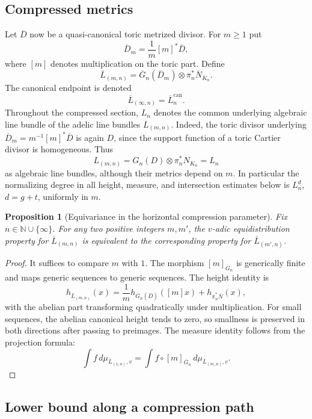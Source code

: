 \documentclass[10pt,a4paper]{amsart}
\theoremstyle{plain}
\newtheorem{proposition}[theorem]{Proposition}
\theoremstyle{plain}
\numberwithin{equation}{section}
\providecommand{\ol}{\overline}
\providecommand{\can}{\operatorname{can}}
\begin{document}
\subsection{Compressed metrics}

Let \(\ol D\) now be a quasi-canonical toric metrized divisor.  For \(m\ge 1\)
put
\[
\ol D_m=\frac{1}{m}[m]^*\ol D,
\]
where \([m]\) denotes multiplication on the toric part.  Define
\[
\ol L_{(m,n)}
=
\ol G_n(\ol D_m)\otimes\ol\pi_n^*\ol N_{K_n}.
\]
The canonical endpoint is denoted
\[
\ol L_{(\infty,n)}=\ol L_n^{\can}.
\]
Throughout the compressed section, \(L_n\) denotes the common underlying
algebraic line bundle of the adelic line bundles \(\ol L_{(m,n)}\).  Indeed,
the toric divisor underlying \(\ol D_m=m^{-1}[m]^*\ol D\) is again \(D\), since
the support function of a toric Cartier divisor is homogeneous.  Thus
\[
L_{(m,n)}
=G_n(D)\otimes\pi_n^*N_{K_n}
=L_n
\]
as algebraic line bundles, although their metrics depend on \(m\).  In
particular the normalizing degree in all height, measure, and intersection
estimates below is \(L_n^d\), \(d=g+t\), uniformly in \(m\).

\begin{proposition}[Equivariance in the horizontal compression parameter]
	\label{prop:horizontal-equivariance}
	Fix \(n\in\mathbb{N}\cup\{\infty\}\).  For any two positive integers \(m,m'\),
	the \(v\)-adic equidistribution property for \(\ol L_{(m,n)}\) is equivalent to
	the corresponding property for \(\ol L_{(m',n)}\).
\end{proposition}

\begin{proof}
	It suffices to compare \(m\) with \(1\).  The morphism
	\([m]_{\ol G_n}\) is generically finite and maps generic sequences to generic
	sequences.  The height identity is
	\[
	h_{\ol L_{(m,n)}}(x)
	=
	\frac{1}{m}h_{\ol G_n(\ol D)}([m]x)
	+h_{\ol\pi_n^*\ol N}(x),
	\]
	with the abelian part transforming quadratically under multiplication.  For
	small sequences, the abelian canonical height tends to zero, so smallness is
	preserved in both directions after passing to preimages.  The measure identity
	follows from the projection formula:
	\[
	\int f\,d\mu_{\ol L_{(1,n)},v}
	=
	\int f\circ[m]_{\ol G_n}\,d\mu_{\ol L_{(m,n)},v}.
	\]
\end{proof}

\subsection{Lower bound along a compression path}
\end{document}
